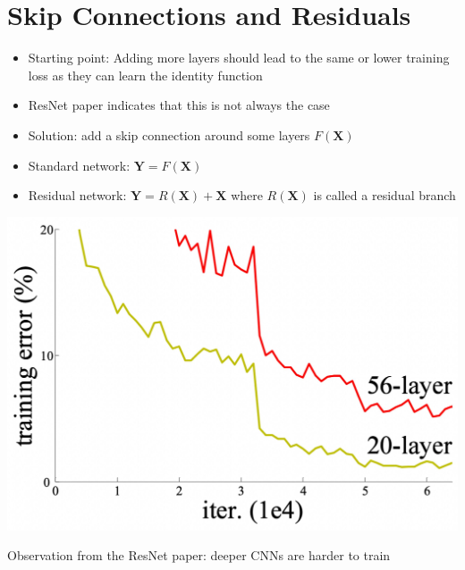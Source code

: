 \documentclass[10pt]{article}
\begin{document}
\section*{Skip Connections and Residuals}
\begin{itemize}
  \item Starting point: Adding more layers should lead to the same or lower training loss as they can learn the identity function

  \item ResNet paper indicates that this is not always the case

  \item Solution: add a skip connection around some layers $F(\mathbf{X})$

  \item Standard network: $\mathbf{Y}=F(\mathbf{X})$

  \item Residual network: $\mathbf{Y}=R(\mathbf{X})+\mathbf{X}$ where $R(\mathbf{X})$ is called a residual branch

\end{itemize}

\begin{center}
\includegraphics[max width=\textwidth]{2024_01_08_959e2db67a31f073f6d2g-19}
\end{center}

Observation from the ResNet paper: deeper CNNs are harder to train
\end{document}
